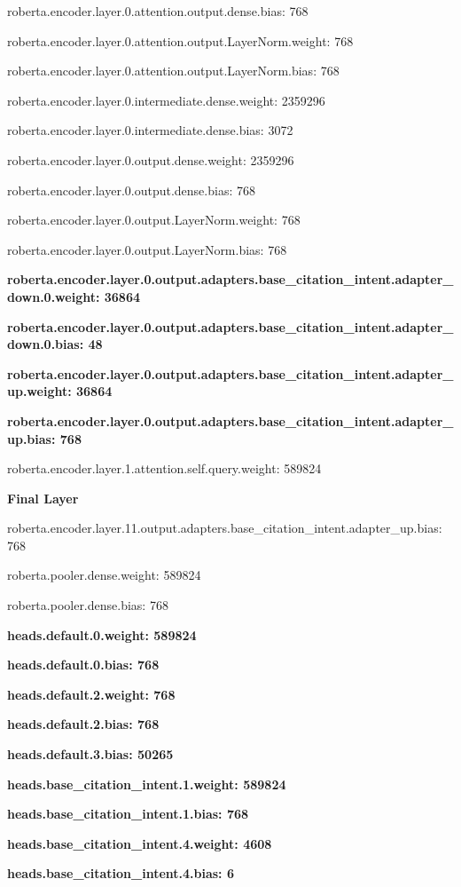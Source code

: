 \documentclass[10pt,twocolumn,letterpaper]{article}
\begin{document}
roberta.encoder.layer.0.attention.output.dense.bias: 768

roberta.encoder.layer.0.attention.output.LayerNorm.weight: 768

roberta.encoder.layer.0.attention.output.LayerNorm.bias: 768

roberta.encoder.layer.0.intermediate.dense.weight: 2359296

roberta.encoder.layer.0.intermediate.dense.bias: 3072

roberta.encoder.layer.0.output.dense.weight: 2359296

roberta.encoder.layer.0.output.dense.bias: 768

roberta.encoder.layer.0.output.LayerNorm.weight: 768

roberta.encoder.layer.0.output.LayerNorm.bias: 768

\textbf{roberta.encoder.layer.0.output.adapters.base\_citation\_intent.adapter\_down.0.weight: 36864}

\textbf{roberta.encoder.layer.0.output.adapters.base\_citation\_intent.adapter\_down.0.bias: 48}

\textbf{roberta.encoder.layer.0.output.adapters.base\_citation\_intent.adapter\_up.weight: 36864}

\textbf{roberta.encoder.layer.0.output.adapters.base\_citation\_intent.adapter\_up.bias: 768}

roberta.encoder.layer.1.attention.self.query.weight: 589824

\textbf{Final Layer}

roberta.encoder.layer.11.output.adapters.base\_citation\_intent.adapter\_up.bias: 768

roberta.pooler.dense.weight: 589824

roberta.pooler.dense.bias: 768

\textbf{heads.default.0.weight: 589824}

\textbf{heads.default.0.bias: 768}

\textbf{heads.default.2.weight: 768}

\textbf{heads.default.2.bias: 768}

\textbf{heads.default.3.bias: 50265}

\textbf{heads.base\_citation\_intent.1.weight: 589824}

\textbf{heads.base\_citation\_intent.1.bias: 768}

\textbf{heads.base\_citation\_intent.4.weight: 4608}

\textbf{heads.base\_citation\_intent.4.bias: 6}
\end{document}
